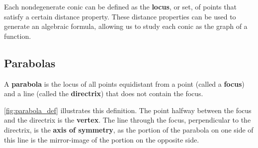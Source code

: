 Each nondegenerate conic can be defined as the \textbf{locus}, or set, of points that satisfy a certain distance property. These distance properties can be used to generate an algebraic formula, allowing us to study each conic as the graph of a function.

\subsection{Parabolas}

\begin{definition}[Parabola]\label{def:parabola}
A \textbf{parabola} is the locus of all points equidistant from a point (called a \textbf{focus}) and a line (called the \textbf{directrix}) that does not contain the focus.
\end{definition}


\autoref{fig:parabola_def} illustrates this definition. The point halfway between the focus and the directrix is the \textbf{vertex}. The line through the focus, perpendicular to the directrix, is the \textbf{axis of symmetry}, as the portion of the parabola on one side of this line is the mirror-image of the portion on the opposite side.

